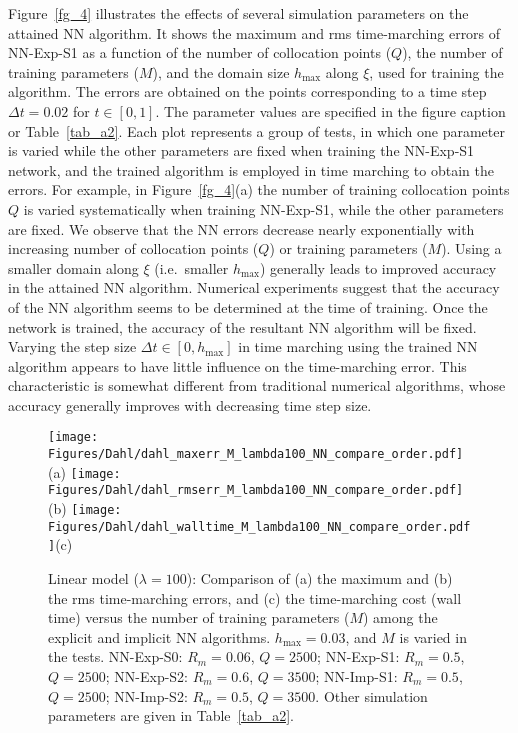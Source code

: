 Figure~\ref{fg_4} illustrates the effects of several simulation parameters
on the attained NN algorithm.
It shows the maximum and rms time-marching errors of NN-Exp-S1
as a function of the number of collocation points ($Q$), the number of training parameters ($M$),
and the domain size $h_{\max}$ along $\xi$,
used for training the algorithm. The errors are
obtained on the points corresponding to a time step $\Delta t=0.02$ for $t\in[0,1]$.
The parameter values are specified in the figure caption or Table~\ref{tab_a2}.
Each plot represents a group of tests, in which one parameter is varied 
while the other parameters are fixed when training the NN-Exp-S1 network,
and the trained algorithm is employed in time marching to obtain the errors.
For example, in Figure~\ref{fg_4}(a) the number of training collocation points
$Q$ is varied systematically when training NN-Exp-S1, while the other parameters are fixed.
%
We observe that the NN errors decrease 
nearly exponentially with increasing number of collocation points ($Q$) or
 training parameters ($M$). 
 Using a smaller domain along $\xi$ (i.e.~smaller $h_{\max}$)
 generally leads to improved accuracy in
the attained NN algorithm.
Numerical experiments suggest that the accuracy of the NN algorithm seems to
be determined at the time of training. Once the network is trained,
the accuracy of the resultant NN algorithm will be fixed.
Varying the step size $\Delta t\in[0,h_{\max}]$ in time marching
using the trained NN algorithm appears to have little influence on the
time-marching error. This characteristic is somewhat different from traditional
numerical algorithms, whose accuracy generally
improves with decreasing time step size.


\begin{figure}
  \centerline{
    \texttt{[image: Figures/Dahl/dahl\_maxerr\_M\_lambda100\_NN\_compare\_order.pdf]}(a)
    \texttt{[image: Figures/Dahl/dahl\_rmserr\_M\_lambda100\_NN\_compare\_order.pdf]}(b)
    \texttt{[image: Figures/Dahl/dahl\_walltime\_M\_lambda100\_NN\_compare\_order.pdf]}(c)
  }
  \caption{Linear model ($\lambda=100$):
    Comparison of  (a) the maximum and (b) the rms time-marching errors,
    and (c) the time-marching cost (wall time)
     versus the number of training parameters ($M$)
     among the explicit and implicit NN algorithms.
     $h_{\max}=0.03$, and $M$ is varied in the tests.
    NN-Exp-S0: $R_m=0.06$, $Q=2500$;
    NN-Exp-S1: $R_m=0.5$, $Q=2500$;
    NN-Exp-S2: $R_m=0.6$, $Q=3500$;
    NN-Imp-S1: $R_m=0.5$, $Q=2500$;
    NN-Imp-S2: $R_m=0.5$, $Q=3500$.
    Other simulation parameters are given in Table~\ref{tab_a2}.
  }
  \label{fg_5}
\end{figure}

